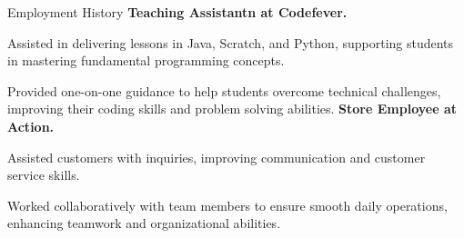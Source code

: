 \begin{rubric}{Employment History}
\entry*[2023 - To Date]%
	\textbf{Teaching Assistantn at Codefever.}\par
	Assisted in delivering lessons in Java, Scratch, and Python, 
	supporting students in mastering fundamental programming 
	concepts.
	\par
	Provided one-on-one guidance to help students overcome 
	technical challenges, improving their coding skills and problem
	solving abilities. 
%
%
\entry*[2021 -- 2024]%
	\textbf{Store Employee at Action.}\par
	Assisted customers with inquiries, improving communication and 
	customer service skills. 
	\par
	Worked collaboratively with team members to ensure smooth 
	daily operations, enhancing teamwork and organizational 
	abilities.
%
\end{rubric}